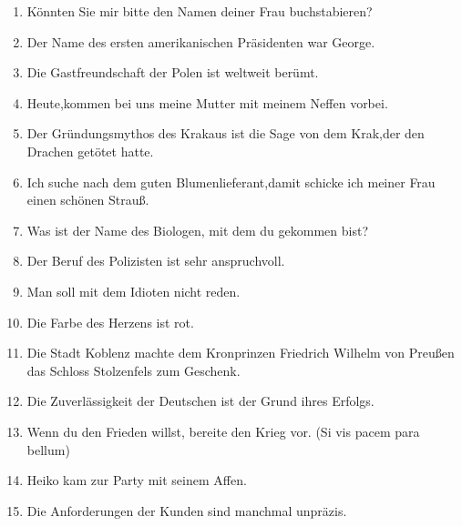 \documentclass[a4paper,12pt]{article}
\begin{document}
\begin{enumerate}
    \item K\"onnten Sie mir bitte den Namen deiner Frau buchstabieren?
    \item Der Name des ersten amerikanischen Pr\"asidenten war George.
    \item Die Gastfreundschaft der Polen ist weltweit ber\"umt.
    \item Heute,kommen bei uns meine Mutter mit meinem Neffen vorbei.
    \item Der Gr\"undungsmythos des Krakaus ist die Sage von dem Krak,der den Drachen get\"otet hatte.
    \item Ich suche nach dem guten Blumenlieferant,damit schicke ich meiner Frau einen sch\"onen Strau\ss.
    \item Was ist der Name des Biologen, mit dem du gekommen bist?
    \item Der Beruf des Polizisten ist sehr anspruchvoll.
    \item Man soll mit dem Idioten nicht reden.
    \item Die Farbe des Herzens ist rot.
    \item Die Stadt Koblenz machte dem Kronprinzen Friedrich Wilhelm von Preu\ss en das Schloss Stolzenfels zum Geschenk.
    \item Die Zuverl\"assigkeit der Deutschen ist der Grund ihres Erfolgs.
    \item Wenn du den Frieden willst, bereite den Krieg vor. (Si vis pacem para bellum)
    \item Heiko kam zur Party mit seinem Affen.
    \item Die Anforderungen der Kunden sind manchmal unpr\"azis.
\end{enumerate}
\end{document}
